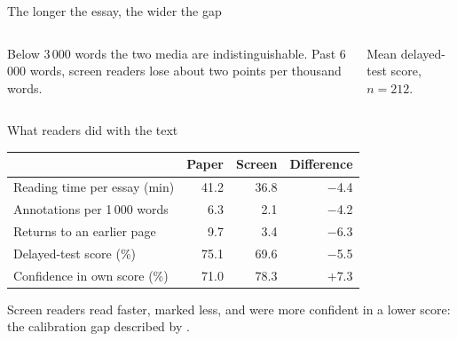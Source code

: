 \documentclass[aspectratio=169,11pt,t]{beamer}
\begin{document}
\begin{frame}{The longer the essay, the wider the gap}
  \begin{columns}[T,onlytextwidth]
      \vspace{2mm}
      {\small Below 3\,000 words the two media are indistinguishable. Past 6\,000 words,
      screen readers lose about two points per thousand words.\par}
      \vspace{2mm}
      {\footnotesize\color{mnMuted}Mean delayed-test score, $n = 212$.\par}
  \end{columns}
\end{frame}

\begin{frame}{What readers did with the text}
  \vspace{1mm}
  \centering
  {\LibertinusSansTLF
  \begin{tabular}{@{}l r r r@{}}
    \toprule
    & \multicolumn{1}{c}{Paper} & \multicolumn{1}{c}{Screen} & \multicolumn{1}{c}{Difference} \\
    \midrule
    Reading time per essay (min)   & 41.2 & 36.8 & $-$4.4 \\
    Annotations per 1\,000 words   & 6.3  & 2.1  & $-$4.2 \\
    Returns to an earlier page     & 9.7  & 3.4  & $-$6.3 \\
    Delayed-test score (\%)        & 75.1 & 69.6 & $-$5.5 \\
    Confidence in own score (\%)   & 71.0 & 78.3 & \textcolor{mnAccent}{$+$7.3} \\
    \bottomrule
  \end{tabular}\par}
  \vspace{4mm}
  {\footnotesize\color{mnMuted}Screen readers read faster, marked less, and were more confident
  in a lower score: the calibration gap described by \textcite{singer2017}.\par}
\end{frame}
\end{document}
